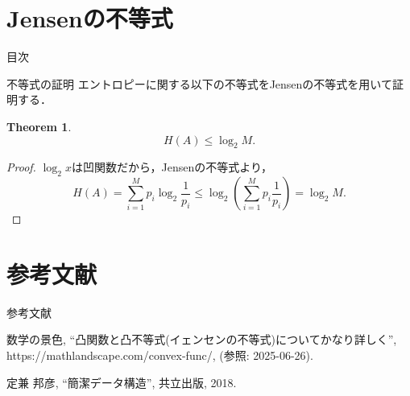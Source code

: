 \documentclass[dvipdfmx,aspectratio=169]{beamer}
\theoremstyle{plain}
\newtheorem{thm}{Theorem}
\theoremstyle{definition}
\begin{document}
\section{Jensenの不等式}
\begin{frame}{目次}
	\tableofcontents[currentsection]
\end{frame}


\begin{frame}{不等式の証明}
    エントロピーに関する以下の不等式をJensenの不等式を用いて証明する．
    \begin{thm}
        \[
        H(A) \le \log_2 M.
        \]
    \end{thm}

    \begin{proof}
        $\log_2 x$は凹関数だから，Jensenの不等式より，
        \[
            H(A) = \sum_{i=1}^M p_{i} \log_2 \frac{1}{p_{i}} \le \log_2 (\sum_{i=1}^M p_{i} \frac{1}{p_{i}}) = \log_2 M.
        \]
    \end{proof}
\end{frame}

\section*{参考文献}
\begin{frame}{参考文献}
\begin{thebibliography}{9}
\renewcommand{\baselinestretch}{1.0}
\small
\beamertemplatetextbibitems
{}
    数学の景色,
    ``凸関数と凸不等式(イェンセンの不等式)についてかなり詳しく'',
    https://mathlandscape.com/convex-func/,
    (参照: 2025-06-26).

    定兼 邦彦,
    ``簡潔データ構造'',
    共立出版, 2018.

\end{thebibliography}
\end{frame}
\end{document}
